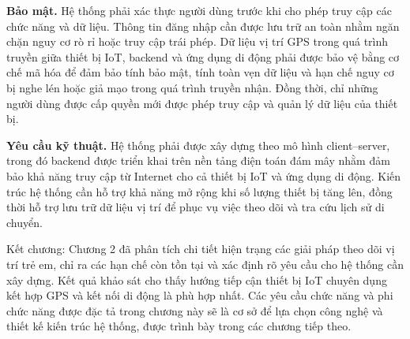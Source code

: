 \documentclass[../DoAn.tex]{subfiles}
\begin{document}
\textbf{Bảo mật.} Hệ thống phải xác thực người dùng trước khi cho phép truy cập các chức năng và dữ liệu. Thông tin đăng nhập cần được lưu trữ an toàn nhằm ngăn chặn nguy cơ rò rỉ hoặc truy cập trái phép. Dữ liệu vị trí GPS trong quá trình truyền giữa thiết bị IoT, backend và ứng dụng di động phải được bảo vệ bằng cơ chế mã hóa để đảm bảo tính bảo mật, tính toàn vẹn dữ liệu và hạn chế nguy cơ bị nghe lén hoặc giả mạo trong quá trình truyền nhận. Đồng thời, chỉ những người dùng được cấp quyền mới được phép truy cập và quản lý dữ liệu của thiết bị.

\textbf{Yêu cầu kỹ thuật.} Hệ thống phải được xây dựng theo mô hình client--server, trong đó backend được triển khai trên nền tảng điện toán đám mây nhằm đảm bảo khả năng truy cập từ Internet cho cả thiết bị IoT và ứng dụng di động. Kiến trúc hệ thống cần hỗ trợ khả năng mở rộng khi số lượng thiết bị tăng lên, đồng thời hỗ trợ lưu trữ dữ liệu vị trí để phục vụ việc theo dõi và tra cứu lịch sử di chuyển.

Kết chương: Chương 2 đã phân tích chi tiết hiện trạng các giải pháp theo dõi vị trí trẻ em, chỉ ra các hạn chế còn tồn tại và xác định rõ yêu cầu cho hệ thống cần xây dựng. Kết quả khảo sát cho thấy hướng tiếp cận thiết bị IoT chuyên dụng kết hợp GPS và kết nối di động là phù hợp nhất. Các yêu cầu chức năng và phi chức năng được đặc tả trong chương này sẽ là cơ sở để lựa chọn công nghệ và thiết kế kiến trúc hệ thống, được trình bày trong các chương tiếp theo.
\end{document}
